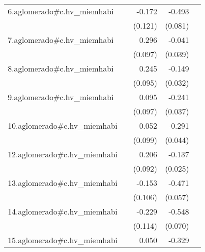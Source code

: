 {\begin{longtable}{l*{4}{D{.}{.}{-1}}}
\addlinespace
6.aglomerado#c.hv\_miemhabi&                     &      -0.172         &      -0.493\sym{***}&                     \\
            &                     &     (0.121)         &     (0.081)         &                     \\
\addlinespace
7.aglomerado#c.hv\_miemhabi&                     &       0.296\sym{**} &      -0.041         &                     \\
            &                     &     (0.097)         &     (0.039)         &                     \\
\addlinespace
8.aglomerado#c.hv\_miemhabi&                     &       0.245\sym{**} &      -0.149\sym{***}&                     \\
            &                     &     (0.095)         &     (0.032)         &                     \\
\addlinespace
9.aglomerado#c.hv\_miemhabi&                     &       0.095         &      -0.241\sym{***}&                     \\
            &                     &     (0.097)         &     (0.037)         &                     \\
\addlinespace
10.aglomerado#c.hv\_miemhabi&                     &       0.052         &      -0.291\sym{***}&                     \\
            &                     &     (0.099)         &     (0.044)         &                     \\
\addlinespace
12.aglomerado#c.hv\_miemhabi&                     &       0.206\sym{*}  &      -0.137\sym{***}&                     \\
            &                     &     (0.092)         &     (0.025)         &                     \\
\addlinespace
13.aglomerado#c.hv\_miemhabi&                     &      -0.153         &      -0.471\sym{***}&                     \\
            &                     &     (0.106)         &     (0.057)         &                     \\
\addlinespace
14.aglomerado#c.hv\_miemhabi&                     &      -0.229\sym{*}  &      -0.548\sym{***}&                     \\
            &                     &     (0.114)         &     (0.070)         &                     \\
\addlinespace
15.aglomerado#c.hv\_miemhabi&                     &       0.050         &      -0.329\sym{***}&                     \\

\end{longtable}}
